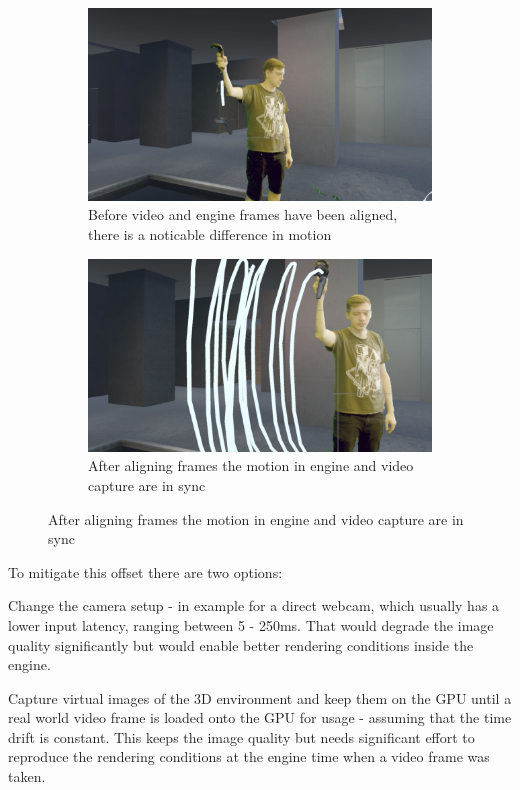 \begin{figure}[htbp]
	\caption[Some Argument]{Visual comparison between unaligned and aligned 
	frames\footnotemark}
	\label{fig:stencil:projection}
	\begin{subfigure}[t]{.45\textwidth}
		\centering
		\includegraphics[width=\textwidth]{gfx/offsets/not_aligned.png}
		\caption{Before video and engine frames have been aligned, there is a 
		noticable difference in motion}
	\end{subfigure}
	\begin{subfigure}[t]{.45\textwidth}
		\centering
		\includegraphics[width=\textwidth]{gfx/offsets/aligned.png}
		\caption{After aligning frames the motion in engine and video capture 
		are in sync}
	\end{subfigure}
	\label{fig:virtual-proj-stencil}
\end{figure}


To mitigate this offset there are two options:

\begin{my_list}
	\item Change the camera setup - in example for a direct webcam, which 
	usually has a lower input latency, ranging between 5 - 250ms. That would 
	degrade the image quality significantly but would enable better rendering 
	conditions inside the engine.
	\item Capture virtual images of the 3D environment and keep them on the GPU 
	until a real world video frame is loaded onto the GPU for usage - assuming 
	that the time drift is constant. This keeps the image quality but needs 
	significant effort to reproduce the rendering conditions at the engine time 
	when a video frame was taken.
\end{my_list}

